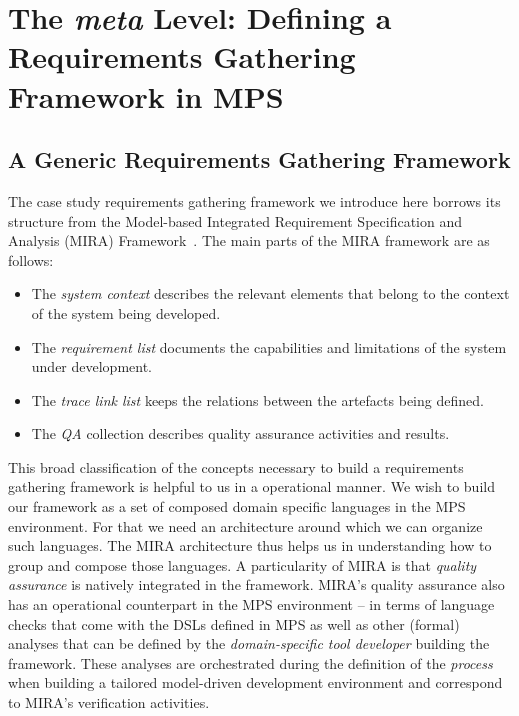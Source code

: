 \section{The \emph{meta} Level: Defining a Requirements Gathering Framework in
MPS}
\label{sec:meta}
\vspace{-.5cm}
\subsection{A Generic Requirements Gathering Framework}
\label{sec:generic_req_fram}
\vspace{-.3cm}
The case study requirements gathering framework we introduce here borrows its
structure from the Model-based Integrated Requirement Specification and Analysis (MIRA)
Framework~\cite{MIRA13}. The main parts of the MIRA framework are
as follows:
\vspace{-.1cm}
\begin{itemize}
  \item The \emph{system context} describes the relevant elements that belong
  to the context of the system being developed.
  \item The \emph{requirement list} documents the capabilities and limitations
  of the system under development.
  \item The \emph{trace link list} keeps the relations between the artefacts
  being defined.
  \item The \emph{QA} collection describes quality assurance activities and
  results.
\end{itemize}
\vspace{-.1cm}
This broad classification of the concepts necessary to build a requirements
gathering framework is helpful to us in a operational manner. We wish to build
our framework as a set of composed domain specific languages in the MPS
environment. For that we need an architecture around which we can organize such
languages. The MIRA architecture thus helps us in understanding how to group and
compose those languages. A particularity of MIRA is that \emph{quality
assurance} is natively integrated in the framework. MIRA's quality assurance
also has an operational counterpart in the MPS environment -- in terms of
language checks that come with the DSLs defined in MPS as well as other (formal)
analyses that can be defined by the \emph{domain-specific tool developer}
building the framework. These analyses are orchestrated during the definition of
the \emph{process} when building a tailored model-driven development environment
and correspond to MIRA's verification activities.\vspace{-.5cm}
